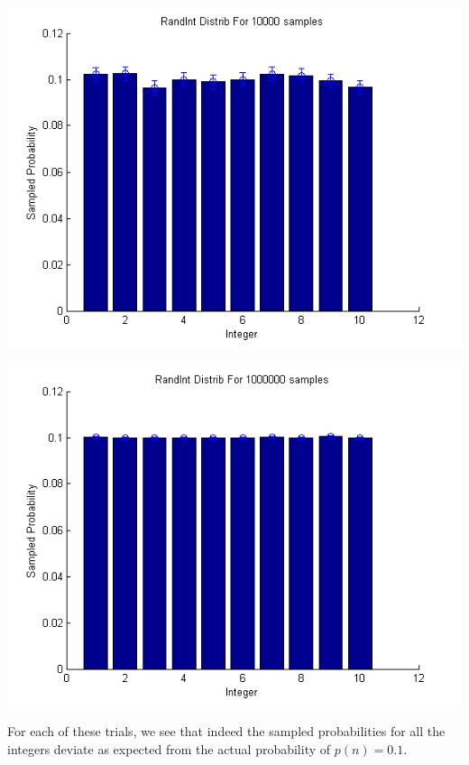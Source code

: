\documentclass{article}
\begin{document}
\begin{enumerate}[i.]
\begin{center}
      \includegraphics[scale=0.5]{prob1part4_2}

      \includegraphics[scale=0.5]{prob1part4_3}
    \end{center}
    For each of these trials, we see that indeed the sampled probabilities for all the integers deviate as expected from the actual probability of $p(n) = 0.1$.
\end{enumerate}
\end{document}
